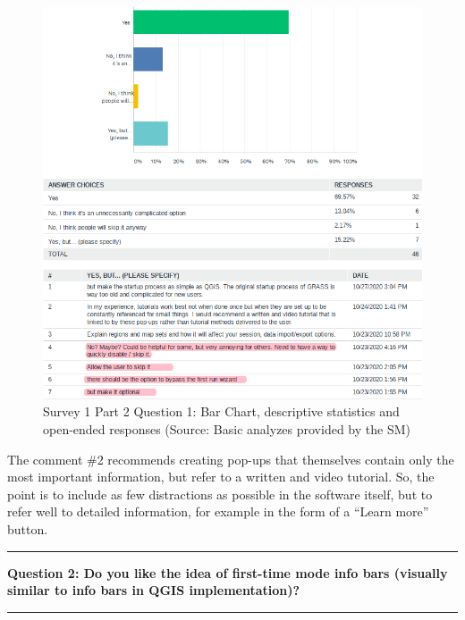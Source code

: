 \documentclass[a4paper,10pt,twoside]{article}
\begin{document}
\vspace{0.3cm}
\begin{figure}[hbt!] 
\begin{center}
\includegraphics[width=15cm]{../surveys/analyzed_data/survey1_part2_question1_all.png} 
\caption[Survey 1 Part 2 Question 1: Bar Chart, descriptive statistics and open-ended responses]{Survey 1 Part 2 Question 1: Bar Chart, descriptive statistics and open-ended responses (Source: Basic analyzes provided by the SM)}
\label{fig:survey1_part2_question1_all}
\end{center}
\end{figure}

\noindent The comment \#2 recommends creating pop-ups that themselves contain only the most important information, but refer to a written and video tutorial. So, the point is to include as few distractions as possible in the software itself, but to refer well to detailed information, for example in the form of a ``Learn more'' button.

\par\noindent\rule{\textwidth}{0.4pt}
\noindent \textbf{Question 2: Do you like the idea of first-time mode info bars (visually similar to info bars in QGIS implementation)?}
\par\noindent\rule{\textwidth}{0.4pt}
\end{document}
